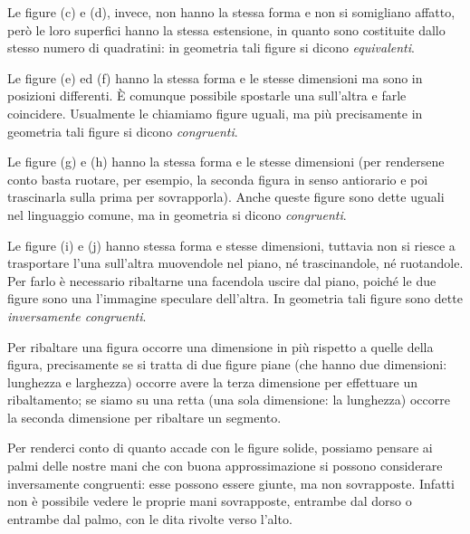 Le figure (c) e (d), invece, non hanno la stessa forma e non si 
somigliano affatto, però le loro superfici hanno la stessa 
estensione, in quanto sono costituite dallo stesso numero di 
quadratini: in geometria tali figure si dicono \emph{equivalenti}.


\begin{inaccessibleblock}
 \begin{figure}[htb]
\centering\qquad\qquad

\end{figure}
\end{inaccessibleblock}

Le figure (e) ed (f) hanno la stessa forma e le stesse dimensioni ma 
sono in posizioni differenti. \`E comunque possibile spostarle una 
sull'altra e farle coincidere. Usualmente le chiamiamo figure uguali, 
ma più precisamente in geometria tali figure si dicono 
\emph{congruenti}.

Le figure (g) e (h) hanno la stessa forma e le stesse dimensioni (per 
rendersene conto basta ruotare, per esempio, la seconda figura in 
senso antiorario e poi trascinarla sulla prima per sovrapporla). 
Anche queste figure sono dette uguali nel linguaggio comune, ma in 
geometria si dicono \emph{congruenti}.

Le figure (i) e (j) hanno stessa forma e stesse dimensioni, tuttavia 
non si riesce a trasportare l'una sull'altra muovendole nel piano, né 
trascinandole, né ruotandole. Per farlo è necessario ribaltarne una 
facendola uscire dal piano, poiché le due figure sono una l'immagine 
speculare dell'altra. In geometria tali figure sono dette 
\emph{inversamente congruenti}.


\begin{inaccessibleblock}
 \begin{figure}[htb]
\centering\label{fig:figure_i_j}
\end{figure}
\end{inaccessibleblock}

\osservazione Per ribaltare una figura occorre una dimensione in più 
rispetto a quelle della figura, precisamente se si tratta di due 
figure piane (che hanno due dimensioni: lunghezza e larghezza)  
occorre avere la terza dimensione per effettuare un ribaltamento; se 
siamo su una retta (una sola dimensione: la lunghezza) occorre la 
seconda dimensione per ribaltare un segmento.

Per renderci conto di quanto accade con le figure solide, possiamo 
pensare ai palmi delle nostre mani che con buona approssimazione si 
possono considerare inversamente congruenti: esse possono essere 
giunte, ma non sovrapposte. Infatti non è possibile vedere le proprie 
mani sovrapposte, entrambe dal dorso o entrambe dal palmo, con le 
dita rivolte verso l'alto.


